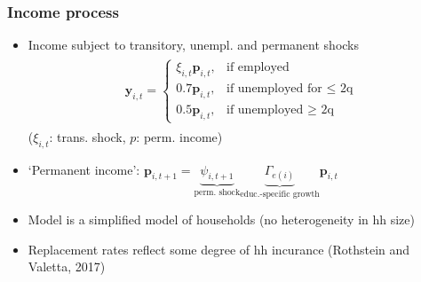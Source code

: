 \documentclass[pdflatex,aspectratio=169]{beamer}
\begin{document}
\begin{frame}
  \frametitle{ Income process}

  \begin{itemize}[<+->]

    \item
          Income subject to transitory, unempl. and permanent shocks
          \begin{equation}
            \begin{gathered}
              \begin{aligned}
                \mathbf{y}_{i,t} =   \begin{cases}
                                       \xi_{i,t}\mathbf{p}_{i,t}, & \text{if employed}                 \\
                                       0.7 \mathbf{p}_{i,t},      & \text{if unemployed for $\leq$ 2q} \\
                                       0.5 \mathbf{p}_{i,t},      & \text{if unemployed $\ge$ 2q}
                                     \end{cases}
              \end{aligned}
            \end{gathered}
          \end{equation}
          ($\xi_{i,t}$: trans.
          shock, $p$: perm.
          income)

    \item
          `Permanent income':  $\mathbf{p}_{i,t+1} = \underbrace{\psi_{i,t+1}}_{\text{perm.
                shock}} \underbrace{\Gamma_{e(i)}}_{\text{educ.-specific growth}}\mathbf{p}_{i,t}$

          \pause
          \bigskip

    \item
          Model is a simplified model of households (no heterogeneity in hh size)
    \item
          Replacement rates reflect some degree of hh incurance (Rothstein and Valetta, 2017)

  \end{itemize}

\end{frame}
\end{document}
